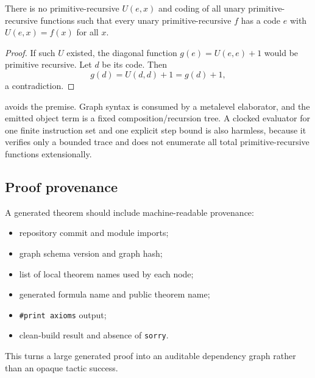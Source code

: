 \begin{barrier}\label{barrier:universal}
There is no primitive-recursive \(U(e,x)\) and coding of all unary primitive-recursive functions such that every unary primitive-recursive \(f\) has a code \(e\) with \(U(e,x)=f(x)\) for all \(x\).
\end{barrier}

\begin{proof}
If such \(U\) existed, the diagonal function \(g(e)=U(e,e)+1\) would be primitive recursive.  Let \(d\) be its code.  Then
\[
 g(d)=U(d,d)+1=g(d)+1,
\]
a contradiction.
\end{proof}

\KIFC avoids the premise.  Graph syntax is consumed by a metalevel elaborator, and the emitted object term is a fixed composition/recursion tree.  A clocked evaluator for one finite instruction set and one explicit step bound is also harmless, because it verifies only a bounded trace and does not enumerate all total primitive-recursive functions extensionally.

\subsection{Proof provenance}

A generated theorem should include machine-readable provenance:
\begin{itemize}
  \item repository commit and module imports;
  \item graph schema version and graph hash;
  \item list of local theorem names used by each node;
  \item generated formula name and public theorem name;
  \item \texttt{\#print axioms} output;
  \item clean-build result and absence of \texttt{sorry}.
\end{itemize}
This turns a large generated proof into an auditable dependency graph rather than an opaque tactic success.
